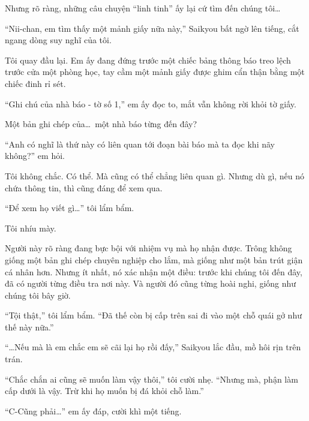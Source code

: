 \documentclass[../main.tex]{subfiles}
\begin{document}
Nhưng rõ ràng, những câu chuyện ``linh tinh'' ấy lại cứ tìm đến chúng tôi\dots

``Nii-chan, em tìm thấy một mảnh giấy nữa này,'' Saikyou bất ngờ lên tiếng, cắt ngang dòng suy nghĩ của tôi.

Tôi quay đầu lại. Em ấy đang đứng trước một chiếc bảng thông báo treo lệch trước cửa một phòng học, tay cầm một mảnh giấy được ghim cẩn thận bằng một chiếc đinh rỉ sét.

``{\vnmsans Ghi chú của nhà báo - tờ số 1,}'' em ấy đọc to, mắt vẫn không rời khỏi tờ giấy.

Một bản ghi chép của\dots\ một nhà báo từng đến đây?

``Anh có nghĩ là thứ này có liên quan tới đoạn bài báo mà ta đọc khi nãy không?'' em hỏi.

Tôi không chắc. Có thể. Mà cũng có thể chẳng liên quan gì. Nhưng dù gì, nếu nó chứa thông tin, thì cũng đáng để xem qua.

``Để xem họ viết gì\dots'' tôi lẩm bẩm.


Tôi nhíu mày.

Người này rõ ràng đang bực bội với nhiệm vụ mà họ nhận được. Trông không giống một bản ghi chép chuyên nghiệp cho lắm, mà giống như một bản trút giận cá nhân hơn. Nhưng ít nhất, nó xác nhận một điều: trước khi chúng tôi đến đây, đã có người từng điều tra nơi này. Và người đó cũng từng hoài nghi, giống như chúng tôi bây giờ.

``Tội thật,'' tôi lẩm bẩm. ``Đã thế còn bị cấp trên sai đi vào một chỗ quái gở như thế này nữa.''

``\dots Nếu mà là em chắc em sẽ cãi lại họ rồi đấy,'' Saikyou lắc đầu, mồ hôi rịn trên trán.

``Chắc chắn ai cũng sẽ muốn làm vậy thôi,'' tôi cười nhẹ. ``Nhưng mà, phận làm cấp dưới là vậy. Trừ khi họ muốn bị đá khỏi chỗ làm.''

``C-Cũng phải\dots'' em ấy đáp, cười khì một tiếng.
\end{document}
